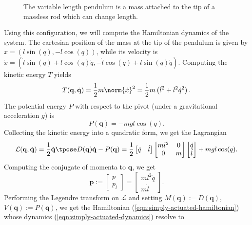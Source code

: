 \begin{figure}
   \centering
   
   \caption{The variable length pendulum is a mass attached to the
      tip of a massless rod which can change length.}\label{fig:vlp-model}
\end{figure}

Using this configuration, we will compute the Hamiltonian dynamics of the system.
The cartesian position of the mass at the tip of the pendulum
is given by \(x = (l\sin(q),-l\cos(q))\), while its velocity is
\(\dot{x} = (\dot{l}\sin(q) + l\cos(q)\dot{q}, -\dot{l}\cos(q) + l\sin(q)\dot{q})\).
Computing the kinetic energy \(T\) yields
\[
   T(\mathbf{q},\dot{\mathbf{q}}) = 
   \frac{1}{2}m\norm{\dot{x}}^2 = \frac{1}{2}m\left(\dot{l}^2 + l^2\dot{q}^2\right)
   .
\]
The potential energy \(P\) with respect to the pivot (under a gravitational
acceleration \(g\)) is
\[
   P(\mathbf{q}) = -mgl\cos(q)
   .
\]
Collecting the kinetic energy into a quadratic form, we get the Lagrangian
\[
   \mathcal{L}(\mathbf{q},\dot{\mathbf{q}}) 
   = \frac{1}{2} \dot{\mathbf{q}}\tpose D(\mathbf{q})\dot{\mathbf{q}} - P(\mathbf{q})
   = \frac{1}{2}
   \begin{bmatrix} \dot{q} & \dot{l} \end{bmatrix}
   \begin{bmatrix}
      ml^2 & 0 \\
      0 & m \\
   \end{bmatrix}
   \begin{bmatrix} 
      \dot{q} \\ \dot{l}
   \end{bmatrix}
   + mgl\cos(q)
   .
\]
Computing the conjugate of momenta to \(\mathbf{q}\), we get 
\[
   \mathbf{p} := \begin{bmatrix} p \\ p_l \end{bmatrix} 
   = \begin{bmatrix} ml^2\dot{q} \\ m\dot{l} \end{bmatrix} 
   .
\]
Performing the Legendre transform on \(\mathcal{L}\) and setting
\(M(\mathbf{q}) := D(\mathbf{q})\), \(V(\mathbf{q}) := P(\mathbf{q})\),
we get the Hamiltonian (\ref{eqn:simply-actuated-hamiltonian}) whose
dynamics (\ref{eqn:simply-actuated-dynamics}) resolve to  
